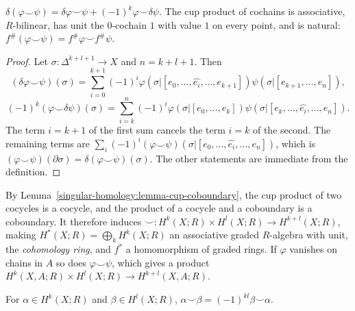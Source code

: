 \begin{lemma}\label{singular-homology:lemma-cup-coboundary}
$\delta(\varphi \smile \psi) = \delta\varphi \smile \psi + (-1)^k\varphi \smile \delta\psi$. The cup product of cochains is associative, $R$-bilinear, has unit the $0$-cochain $1$
with value $1$ on every point, and is natural: $f^\#(\varphi \smile \psi) = f^\#\varphi \smile f^\#\psi$.
\end{lemma}

\begin{proof}
Let $\sigma \colon \Delta^{k+l+1} \to X$ and $n = k + l + 1$. Then
\[
(\delta\varphi \smile \psi)(\sigma) = \sum_{i=0}^{k+1}(-1)^i\varphi(\sigma|[e_0, \ldots, \widehat{e_i}, \ldots, e_{k+1}])\psi(\sigma|[e_{k+1}, \ldots, e_n]),
\]
\[
(-1)^k(\varphi \smile \delta\psi)(\sigma) = \sum_{i=k}^{n}(-1)^i\varphi(\sigma|[e_0, \ldots, e_k])\psi(\sigma|[e_k, \ldots, \widehat{e_i}, \ldots, e_n]).
\]
The term $i = k + 1$ of the first sum cancels the term $i = k$ of the second. The remaining terms are $\sum_i (-1)^i(\varphi \smile \psi)(\sigma|[e_0, \ldots, \widehat{e_i}, \ldots, e_n])$,
which is $(\varphi \smile \psi)(\partial\sigma) = \delta(\varphi \smile \psi)(\sigma)$. The other statements are immediate from the definition.
\end{proof}

\begin{definition}\label{singular-homology:definition-cohomology-ring}
By Lemma~\ref{singular-homology:lemma-cup-coboundary}, the cup product of two cocycles is a cocycle, and the product of a cocycle and a coboundary is a coboundary. It
therefore induces $\smile \colon H^k(X; R) \times H^l(X; R) \to H^{k+l}(X; R)$, making $H^*(X; R) = \bigoplus_k H^k(X; R)$ an associative graded $R$-algebra with unit, the
\emph{cohomology ring}, and $f^*$ a homomorphism of graded rings. If $\varphi$ vanishes on chains in $A$ so does $\varphi \smile \psi$, which gives a product
$H^k(X, A; R) \times H^l(X; R) \to H^{k+l}(X, A; R)$.
\end{definition}

\begin{theorem}\label{singular-homology:theorem-graded-commutative}
For $\alpha \in H^k(X; R)$ and $\beta \in H^l(X; R)$, $\alpha \smile \beta = (-1)^{kl}\beta \smile \alpha$.
\end{theorem}

